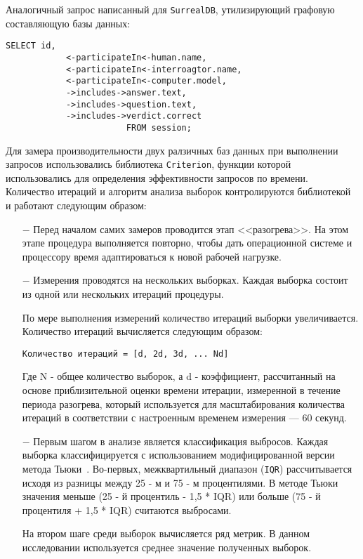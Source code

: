 Аналогичный запрос написанный для \texttt{SurrealDB}, утилизирующий графовую составляющую базы данных:

\begin{lstlisting}
SELECT id,
			<-participateIn<-human.name,
			<-participateIn<-interroagtor.name, 
			<-participateIn<-computer.model, 
			->includes->answer.text, 
			->includes->question.text, 
			->includes->verdict.correct 
						FROM session;
\end{lstlisting}

Для замера производительности двух ралзичных баз данных при выполнении запросов использовались библиотека \texttt{Criterion}, функции которой использовались для определения эффективности запросов по времени.
Количество итераций и алгоритм анализа выборок контролируются библиотекой~\cite{criterion-anal} и работают следующим образом:
\begin{itemize}
	\item[$-$] Перед началом самих замеров проводится этап <<разогрева>>. 
	На этом этапе процедура выполняется повторно, чтобы дать операционной системе и процессору время адаптироваться к новой рабочей нагрузке.
	\item[$-$] Измерения проводятся на нескольких выборках. Каждая выборка состоит из одной или нескольких итераций процедуры.

	По мере выполнения измерений количество итераций выборки увеличивается. Количество итераций вычисляется следующим образом:

	\texttt{Количество итераций = [d, 2d, 3d, ... Nd]}

	Где N - общее количество выборок, а d - коэффициент, рассчитанный на основе приблизительной оценки времени итерации, измеренной в течение периода разогрева, который используется для масштабирования количества итераций в соответствии с настроенным временем измерения --- 60 секунд.
	
	\item[$-$] Первым шагом в анализе является классификация выбросов. 
		Каждая выборка классифицируется с использованием модифицированной версии метода Тьюки~\cite{tukey}.
		Во-первых, межквартильный диапазон (\texttt{IQR}) рассчитывается исходя из разницы между 25 - м и 75 - м процентилями. 
		В методе Тьюки значения меньше (25 - й процентиль - 1,5 * IQR) или больше (75 - й процентиля + 1,5 * IQR) считаются выбросами. 

		На втором шаге среди выборок вычисляется ряд метрик. 
		В данном исследовании используется среднее значение полученных выборок.
\end{itemize}

